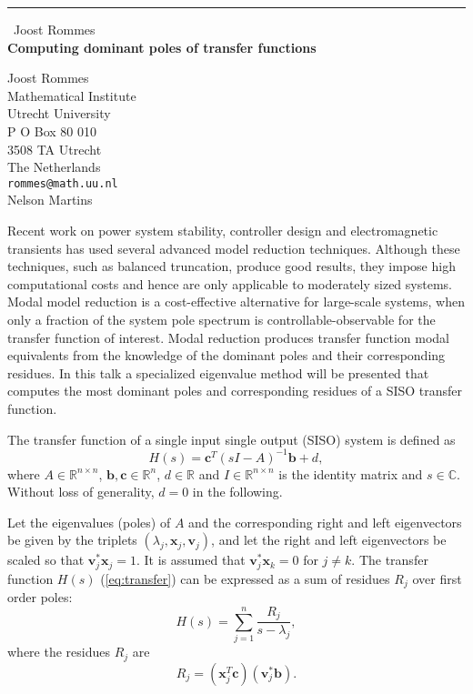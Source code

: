 \documentclass{report}
\begin{document}
\begin{center}
\rule{6in}{1pt} \
{\large Joost Rommes \\
{\bf Computing dominant poles of transfer functions}}

Joost Rommes \\ Mathematical Institute \\ Utrecht University \\ P O Box 80 010 \\ 3508 TA Utrecht \\ The Netherlands
\\
{\tt rommes@math.uu.nl}\\
Nelson Martins\end{center}

\newcommand{\vx}{\mathbf{x}}
\newcommand{\vv}{\mathbf{v}}
\newcommand{\vtx}{\tilde{\mathbf{x}}}
\newcommand{\vtv}{\tilde{\mathbf{v}}}
\newcommand{\vb}{\mathbf{b}}
\newcommand{\vc}{\mathbf{c}}
\newcommand{\mR}{\mathbb{R}}
\newcommand{\mRn}{\mathbb{R}^n}
\newcommand{\mRnn}{\mathbb{R}^{n\times n}}
\newcommand{\mC}{\mathbb{C}}

Recent work on power system stability, controller design and
electromagnetic transients has used several advanced
model reduction techniques. Although these
techniques, such as balanced truncation, produce good results, they impose high
computational costs and hence are only applicable to moderately sized
systems. Modal model reduction is a cost-effective alternative for
large-scale systems, when only a fraction of the system pole spectrum is
controllable-observable for the transfer function of interest. Modal reduction
produces transfer function modal equivalents from the knowledge of the dominant
poles and their corresponding residues. In this talk a specialized eigenvalue
method will be presented that computes the most dominant poles and corresponding
residues of a SISO transfer function.

The transfer function of a single input single output (SISO) system is defined as
\begin{equation}\label{eq:transfer}
H(s) = \vc^T (sI - A)^{-1}\vb + d,
\end{equation}
where $A\in\mRnn$, $\vb,\vc\in\mRn$, $d\in\mR$ and $I\in\mRnn$ is the
identity matrix and $s\in\mC$. Without loss of generality, $d=0$ in the
following.

Let the eigenvalues (poles) of $A$ and the corresponding right and left eigenvectors be
given by the triplets $(\lambda_j,\vx_j,\vv_j)$, and let the right and left
eigenvectors be scaled so that $\vv_j^*\vx_j=1$. It is assumed that $\vv_j^*\vx_k=0$ for
$j\neq k$. The transfer function
$H(s)$ (\ref{eq:transfer}) can be expressed as a sum of residues $R_j$
over first order poles:
\begin{equation}
H(s) = \sum_{j=1}^n \frac{R_j}{s - \lambda_j},\nonumber
\end{equation}
where the residues $R_j$ are
\begin{equation}
R_j = (\vx_j^T\vc)(\vv_j^*\vb).\nonumber
\end{equation}
\end{document}
